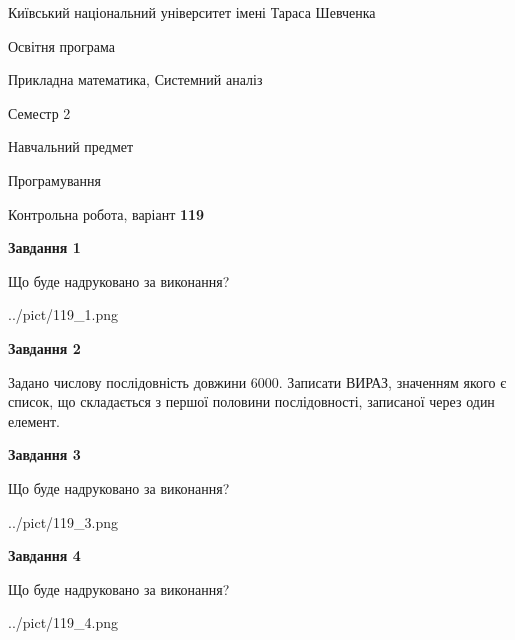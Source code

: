 \documentclass[12pt, ukrainian]{article}
\begin{document}
{{\begin {small}\par
{ \center  Київський національний університет імені Тараса Шевченка \par}
{\parbox {5 cm}{Освітня програма \hfill}{\parbox {8 cm}{Прикладна математика, Системний аналіз \hfill}}\parbox {5 cm}{\hfill Семестр 2}}\par
{\parbox {5 cm} {Навчальний предмет \hfill}\parbox {7 cm}{Програмування \hfill}\parbox {6cm}{\hfill}\par}\vspace{-7pt} \end{small}}{\center Контрольна робота, варіант  \No \textbf
{ 119 }\par}}
{
\begin {large}
{\begin {center}\textbf{Завдання 1}\end {center}}\par
Що буде надруковано за виконання?\par\par
\begin{center}
	{../pict/119_1.png}
\end{center}
\newpage

{\begin {center}\textbf{Завдання 2}\end {center}}\par

 Задано числову послідовність  довжини 6000. Записати ВИРАЗ, значенням якого є список, що складається з першої половини послідовності, записаної через один елемент.\par
\newpage

{\begin {center}\textbf{Завдання 3}\end {center}}\par
Що буде надруковано за виконання?
\begin{center}
	{../pict/119_3.png}
\end{center}
\newpage

{\begin {center}\textbf{Завдання 4}\end {center}}\par
Що буде надруковано за виконання?\par
\begin{center}
	{../pict/119_4.png}
\end{center}
\newpage


\end{large}}
\end{document}
